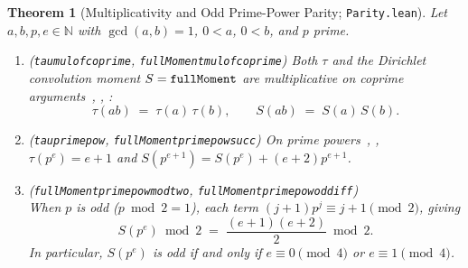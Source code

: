 \documentclass[11pt,reqno]{amsart}
\theoremstyle{plain}
\newtheorem{theorem}{Theorem}[section]
\theoremstyle{definition}
\theoremstyle{remark}
\newcommand{\leanid}[1]{\texttt{\upshape\def\_{\char95\relax}#1}}
\newcommand{\N}{\mathbb{N}}
\begin{document}
\begin{theorem}[Multiplicativity and Odd Prime-Power Parity; \leanid{Parity.lean}]
\label{thm:parity}
Let $a, b, p, e \in \N$ with $\gcd(a, b) = 1$, $0 < a$, $0 < b$, and $p$ prime.
\begin{enumerate}
  \item (\leanid{tau\_\allowbreak mul\_\allowbreak of\_\allowbreak coprime}, \leanid{fullMoment\_\allowbreak mul\_\allowbreak of\_\allowbreak coprime}) Both $\tau$ and the Dirichlet convolution moment $S = \leanid{fullMoment}$ are multiplicative on coprime arguments~\cite[Ch.~2]{Apostol1976}, \cite[Ch.~6]{Burton1976}, \cite{OEIS-A060640}:
  \[
    \tau(a b) \;=\; \tau(a)\,\tau(b),
    \qquad
    S(a b) \;=\; S(a)\,S(b).
  \]
  \item (\leanid{tau\_\allowbreak prime\_\allowbreak pow}, \leanid{fullMoment\_\allowbreak prime\_\allowbreak pow\_\allowbreak succ}) On prime powers~\cite[Ch.~6]{Burton1976}, \cite[Ch.~3]{Tattersall1999}, $\tau(p^e) = e + 1$ and $S(p^{e+1}) = S(p^e) + (e + 2)p^{e+1}$.
  \item (\leanid{fullMoment\_\allowbreak prime\_\allowbreak pow\_\allowbreak mod\_\allowbreak two}, \leanid{fullMoment\_\allowbreak prime\_\allowbreak pow\_\allowbreak odd\_\allowbreak iff})\\
  When $p$ is odd ($p \bmod 2 = 1$), each term $(j+1)p^j \equiv j + 1 \pmod 2$, giving
  \[
    S(p^e) \bmod 2 \;=\; \frac{(e + 1)(e + 2)}{2} \bmod 2.
  \]
  In particular, $S(p^e)$ is odd if and only if $e \equiv 0 \pmod 4$ or $e \equiv 1 \pmod 4$.
\end{enumerate}
\end{theorem}
\end{document}
